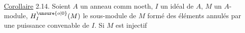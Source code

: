\uline{Corollaire} 2.14. Soient $A$ un anneau comm noeth, $I$ un idéal de $A$, $M$ un
$A$-module, $H_I^{\unsure{o|0}}(M)$ le sous-module de $M$ formé des éléments annulés par une
puissance convenable de $I$. Si $M$ est injectif

